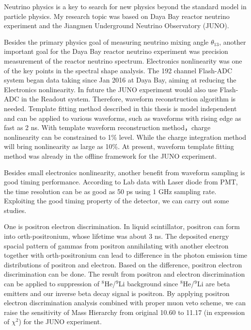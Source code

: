 \begin{englishabstract}
Neutrino physics is a key to search for new physics beyond the
standard model in particle physics. My research topic was based on Daya Bay reactor neutrino experiment and the Jiangmen Underground Neutrino Observatory (JUNO).

Besides the primary physics goal of measuring neutrino mixing angle $\theta_{13}$, another important goal for the Daya Bay reactor neutrino experiment was precision measurement of the reactor neutrino spectrum. Electronics nonlinearity was one of the key points in the spectral shape analysis. The 192 channel Flash-ADC system began data taking since Jan 2016 at Daya Bay, aiming at reducing the Electronics nonlinearity.  In future the JUNO experiment would also use Flash-ADC in the Readout system. Therefore, waveform reconstruction algorithm is needed. Template fitting method described in this thesis is model independent and can be applied to various waveforms, such as waveforms with rising edge as fast as 2 ns. With template waveform reconstruction method，charge nonlinearity can be constrained to 1\% level. While the charge integration method will bring nonlinearity as large as 10\%. At present, waveform template fitting method was already in the offline framework for the JUNO experiment.

Besides small electronics nonlinearity, another benefit from waveform sampling is good timing performance. According to Lab data with Laser diode from PMT, the time resolution can be as good as 50 ps using 1 GHz sampling rate. Exploiting the good timing property of the detector, we can carry out some studies.

One is positron electron discrimination. In liquid scintillator, positron can form into orth-positronium, whose lifetime was about 3 ns. The deposited energy spacial pattern of gammas from positron annihilating with another electron together with orth-positronium can lead to difference in the photon emission time distributions of positron and electron. Based on the difference, positron electron discrimination can be done. The result from positron and electron discrimination can be applied to suppression of $^8$He/$^9$Li background since $^8$He/$^9$Li are beta emitters and our inverse beta decay signal is positron. By applying positron electron discrimination analysis combined with proper muon veto scheme, we can raise the sensitivity of Mass Hierarchy from original 10.60 to 11.17 (in expression of $\chi^2$) for the JUNO experiment.



\end{englishabstract}
